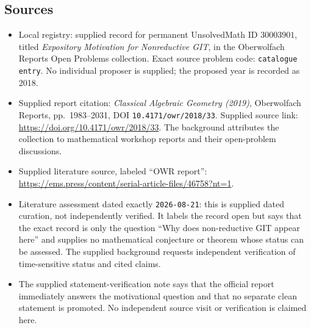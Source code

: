 \documentclass[11pt]{article}
\begin{document}
\subsection{Sources}
\begin{itemize}
\item Local registry: supplied record for permanent UnsolvedMath ID \(30003901\), titled \emph{Expository Motivation for Nonreductive GIT}, in the Oberwolfach Reports Open Problems collection. Exact source problem code: \texttt{catalogue entry}. No individual proposer is supplied; the proposed year is recorded as 2018.
\item Supplied report citation: \emph{Classical Algebraic Geometry (2019)}, Oberwolfach Reports, pp.\ 1983--2031, DOI \texttt{10.4171/owr/2018/33}. Supplied source link: \url{https://doi.org/10.4171/owr/2018/33}. The background attributes the collection to mathematical workshop reports and their open-problem discussions.
\item Supplied literature source, labeled ``OWR report'': \url{https://ems.press/content/serial-article-files/46758?nt=1}.
\item Literature assessment dated exactly \texttt{2026-08-21}: this is supplied dated curation, not independently verified. It labels the record open but says that the exact record is only the question ``Why does non-reductive GIT appear here'' and supplies no mathematical conjecture or theorem whose status can be assessed. The supplied background requests independent verification of time-sensitive status and cited claims.
\item The supplied statement-verification note says that the official report immediately answers the motivational question and that no separate clean statement is promoted. No independent source visit or verification is claimed here.
\end{itemize}
\end{document}
